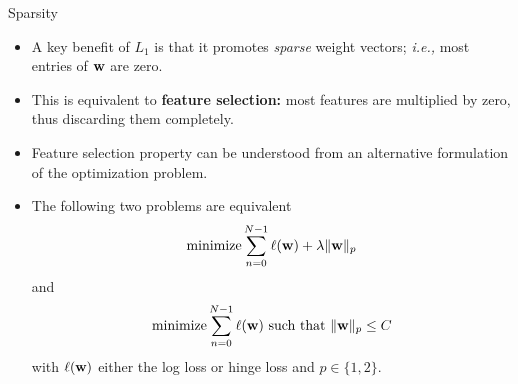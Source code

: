 \documentclass[10pt, aspectratio=169]{beamer} %
\newcommand{\w}{{\bf w}}
\begin{document}
\begin{frame}{Sparsity}
\begin{itemize}
\item A key benefit of $L_1$ is that it promotes \emph{sparse} weight vectors; \emph{i.e.,} most entries of $\w$ are zero.
\item This is equivalent to \textbf{feature selection:} most features are multiplied by zero, thus discarding them completely.
\item Feature selection property can be understood from an alternative formulation of the optimization problem.
\item The following two problems are equivalent
\[
\text{minimize} \sum_{n = 0}^{N-1} \ell(\w) + \lambda \|\w\|_p
\]
and
\[
\text{minimize} \sum_{n = 0}^{N-1} \ell(\w) \text{ such that } \|\w\|_p \le C
\]
with $\ell(\w)$ either the log loss or hinge loss and $p\in \{1,2\}$.
\end{itemize}
\end{frame}
\end{document}
